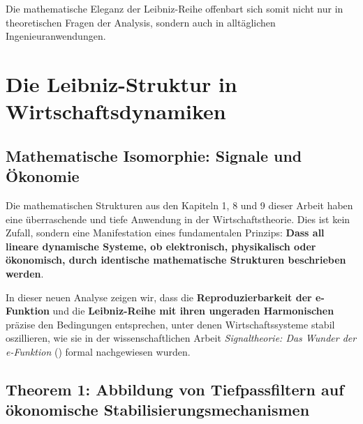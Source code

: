\documentclass[a4paper,12pt,twoside]{report}
\theoremstyle{definition}
\begin{document}
Die mathematische Eleganz der Leibniz-Reihe offenbart sich somit nicht nur in theoretischen Fragen der Analysis, sondern auch in alltäglichen Ingenieuranwendungen.

\section{Die Leibniz-Struktur in Wirtschaftsdynamiken}

\subsection{Mathematische Isomorphie: Signale und Ökonomie}

Die mathematischen Strukturen aus den Kapiteln 1, 8 und 9 dieser Arbeit haben eine überraschende und tiefe Anwendung in der Wirtschaftstheorie. Dies ist kein Zufall, sondern eine Manifestation eines fundamentalen Prinzips: \textbf{Dass all lineare dynamische Systeme, ob elektronisch, physikalisch oder ökonomisch, durch identische mathematische Strukturen beschrieben werden}.

In dieser neuen Analyse zeigen wir, dass die \textbf{Reproduzierbarkeit der e-Funktion} und die \textbf{Leibniz-Reihe mit ihren ungeraden Harmonischen} präzise den Bedingungen entsprechen, unter denen Wirtschaftssysteme stabil oszillieren, wie sie in der wissenschaftlichen Arbeit \textit{Signaltheorie: Das Wunder der e-Funktion} (\cite{epp_signal}) formal nachgewiesen wurden.

\subsection*{Theorem 1: Abbildung von Tiefpassfiltern auf ökonomische Stabilisierungsmechanismen}
\end{document}
